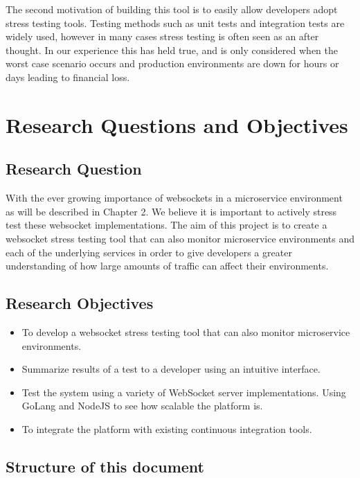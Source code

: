The second motivation of building this tool is to easily allow developers adopt stress testing tools. Testing methods such as unit tests and integration tests are widely used, however in many cases stress testing is often seen as an after thought. In our experience this has held true, and is only considered when the worst case scenario occurs and production environments are down for hours or days leading to financial loss.

\section{Research Questions and Objectives}

\subsection{Research Question}

With the ever growing importance of websockets in a microservice environment as will be described in Chapter 2. We believe it is important to actively stress test these websocket implementations. The aim of this project is to create a websocket stress testing tool that can also monitor microservice environments and each of the underlying services in order to give developers a greater understanding of how large amounts of traffic can affect their environments.

\subsection{Research Objectives}

\begin{itemize}
  \item To develop a websocket stress testing tool that can also monitor microservice environments.
  \item Summarize results of a test to a developer using an intuitive interface.
  \item Test the system using a variety of WebSocket server implementations. Using GoLang and NodeJS to see how scalable the platform is.
  \item To integrate the platform with existing continuous integration tools.
\end{itemize}

\subsection{Structure of this document}

